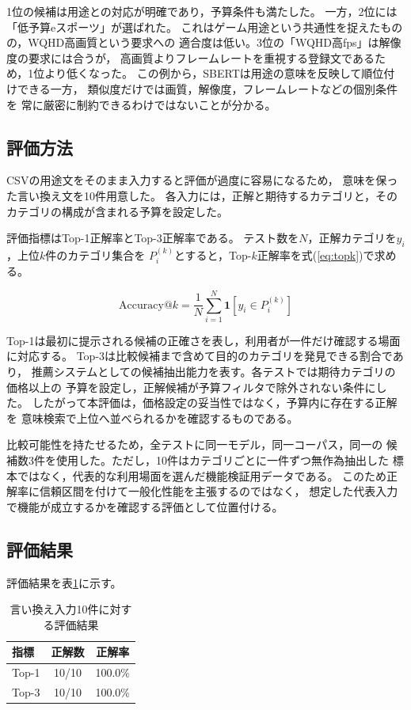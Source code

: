 \documentclass[a4paper,11pt]{article}
\begin{document}
1位の候補は用途との対応が明確であり，予算条件も満たした。
一方，2位には「低予算eスポーツ」が選ばれた。
これはゲーム用途という共通性を捉えたものの，WQHD高画質という要求への
適合度は低い。3位の「WQHD高fps」は解像度の要求には合うが，
高画質よりフレームレートを重視する登録文であるため，1位より低くなった。
この例から，SBERTは用途の意味を反映して順位付けできる一方，
類似度だけでは画質，解像度，フレームレートなどの個別条件を
常に厳密に制約できるわけではないことが分かる。

\subsection{評価方法}
CSVの用途文をそのまま入力すると評価が過度に容易になるため，
意味を保った言い換え文を10件用意した。
各入力には，正解と期待するカテゴリと，そのカテゴリの構成が含まれる予算を設定した。

評価指標はTop-1正解率とTop-3正解率である。
テスト数を$N$，正解カテゴリを$y_i$，上位$k$件のカテゴリ集合を
$P_i^{(k)}$とすると，Top-$k$正解率を式(\ref{eq:topk})で求める。

\begin{equation}
  \mathrm{Accuracy@}k =
  \frac{1}{N}\sum_{i=1}^{N}
  \mathbf{1}\left[y_i \in P_i^{(k)}\right]
  \label{eq:topk}
\end{equation}

Top-1は最初に提示される候補の正確さを表し，利用者が一件だけ確認する場面に対応する。
Top-3は比較候補まで含めて目的のカテゴリを発見できる割合であり，
推薦システムとしての候補抽出能力を表す。各テストでは期待カテゴリの価格以上の
予算を設定し，正解候補が予算フィルタで除外されない条件にした。
したがって本評価は，価格設定の妥当性ではなく，予算内に存在する正解を
意味検索で上位へ並べられるかを確認するものである。

比較可能性を持たせるため，全テストに同一モデル，同一コーパス，同一の
候補数3件を使用した。ただし，10件はカテゴリごとに一件ずつ無作為抽出した
標本ではなく，代表的な利用場面を選んだ機能検証用データである。
このため正解率に信頼区間を付けて一般化性能を主張するのではなく，
想定した代表入力で機能が成立するかを確認する評価として位置付ける。

\subsection{評価結果}
評価結果を表\ref{tab:result}に示す。

\begin{table}[htbp]
  \centering
  \caption{言い換え入力10件に対する評価結果}
  \label{tab:result}
  \begin{tabular}{lcc}
    \toprule
    指標 & 正解数 & 正解率\\
    \midrule
    Top-1 & 10/10 & 100.0\%\\
    Top-3 & 10/10 & 100.0\%\\
    \bottomrule
  \end{tabular}
\end{table}
\end{document}
